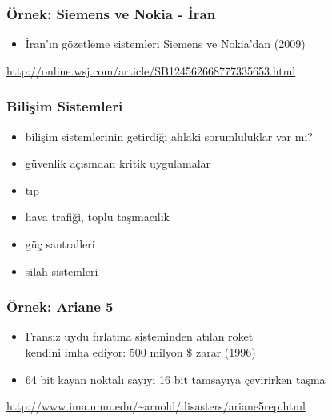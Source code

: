 \documentclass[dvipsnames]{beamer}
\theoremstyle{plain}
\begin{document}
\begin{frame}
  \frametitle{Örnek: Siemens ve Nokia - İran}

  \begin{center}
  \end{center}

  \begin{itemize}
    \item İran'ın gözetleme sistemleri Siemens ve Nokia'dan (2009)
  \end{itemize}

  \medskip
  \tiny{\url{http://online.wsj.com/article/SB124562668777335653.html}}\\
\end{frame}

\begin{frame}
  \frametitle{Bilişim Sistemleri}

  \begin{itemize}
    \item bilişim sistemlerinin getirdiği ahlaki sorumluluklar var mı?

    \bigskip
    \item güvenlik açısından kritik uygulamalar
    \smallskip
    \item tıp
    \item hava trafiği, toplu taşımacılık
    \item güç santralleri
    \item silah sistemleri
  \end{itemize}
\end{frame}

\begin{frame}
  \frametitle{Örnek: Ariane 5}

  \begin{center}
  \end{center}

  \begin{itemize}
    \item Fransız uydu fırlatma sisteminden atılan roket\\
      kendini imha ediyor: 500 milyon \$ zarar (1996)
    \item 64 bit kayan noktalı sayıyı 16 bit tamsayıya çevirirken taşma
  \end{itemize}

  \medskip
  \tiny{\url{http://www.ima.umn.edu/~arnold/disasters/ariane5rep.html}}\\
\end{frame}
\end{document}
